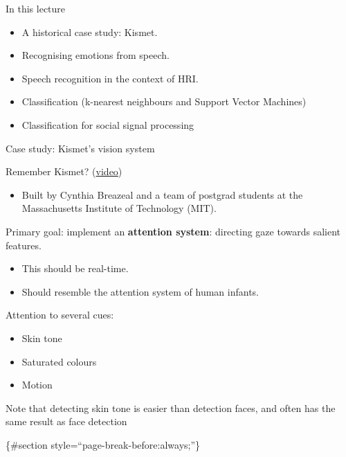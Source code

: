 \documentclass[compress]{beamer}
\providecommand{\tightlist}{%
  \setlength{\itemsep}{0pt}\setlength{\parskip}{0pt}}
\begin{document}
\begin{frame}{In this lecture}

\begin{itemize}
\tightlist
\item
  A historical case study: Kismet.
\item
  Recognising emotions from speech.
\item
  Speech recognition in the context of HRI.
\item
  Classification (k-nearest neighbours and Support Vector Machines)
\item
  Classification for social signal processing
\end{itemize}

\end{frame}

\begin{frame}{Case study: Kismet's vision system}

Remember Kismet?
(\href{https://www.youtube.com/watch?v=8KRZX5KL4fA}{video})

\begin{itemize}
\tightlist
\item
  Built by Cynthia Breazeal and a team of postgrad students at the
  Massachusetts Institute of Technology (MIT).
\end{itemize}

Primary goal: implement an \textbf{attention system}: directing gaze
towards salient features.

\begin{itemize}
\tightlist
\item
  This should be real-time.
\item
  Should resemble the attention system of human infants.
\end{itemize}

Attention to several cues:

\begin{itemize}
\tightlist
\item
  Skin tone
\item
  Saturated colours
\item
  Motion
\end{itemize}

Note that detecting skin tone is easier than detection faces, and often
has the same result as face detection

\{\#section style=``page-break-before:always;''\}

\end{frame}
\end{document}
